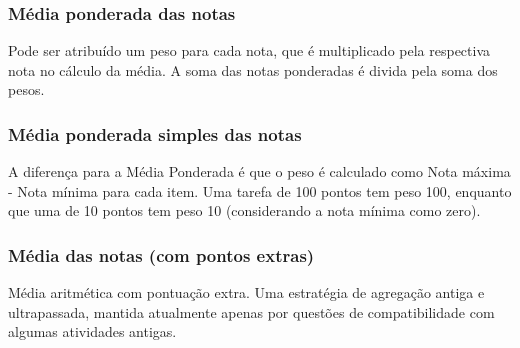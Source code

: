 \begin{figure}[htbp]
 \begin{center}
  \label{fig:cap6_5}
 \end{center}
\end{figure}

\subsubsection{Média ponderada das notas}
Pode ser atribuído um peso para cada nota, que é multiplicado pela respectiva nota no cálculo da média. A soma das notas ponderadas é divida pela soma dos pesos.

\begin{figure}[htbp]
 \begin{center}
  \label{fig:cap6_6}
 \end{center}
\end{figure}

\subsubsection{Média ponderada simples das notas}
A diferença para a Média Ponderada é que o peso é calculado como Nota máxima - Nota mínima para cada item. Uma tarefa de 100 pontos tem peso 100, enquanto que uma de 10 pontos tem peso 10 (considerando a nota mínima como zero).

\begin{figure}[htbp]
 \begin{center}
  \label{fig:cap6_7}
 \end{center}
\end{figure}

\subsubsection{Média das notas (com pontos extras)}
Média aritmética com pontuação extra. Uma estratégia de agregação antiga e ultrapassada, mantida atualmente apenas por questões de compatibilidade com algumas atividades antigas.
